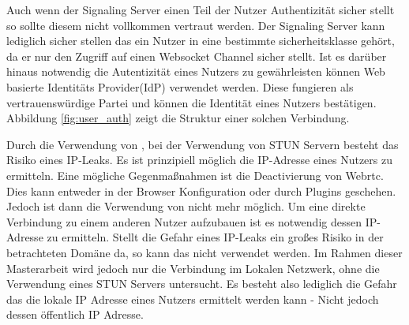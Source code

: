 Auch wenn der Signaling Server einen Teil der Nutzer Authentizität sicher stellt so sollte diesem nicht vollkommen vertraut werden. Der Signaling Server kann lediglich sicher stellen das ein Nutzer in eine bestimmte sicherheitsklasse gehört, da er nur den Zugriff auf einen Websocket Channel sicher stellt. Ist es darüber hinaus notwendig die Autentizität eines Nutzers zu gewährleisten können Web basierte Identitäts Provider(IdP) verwendet werden. Diese fungieren als vertrauenswürdige Partei und können die Identität eines Nutzers bestätigen. Abbildung \ref{fig:user_auth} zeigt die Struktur einer solchen Verbindung.

Durch die Verwendung von \webrtc, bei der Verwendung von STUN Servern besteht das Risiko eines IP-Leaks.\cite{rtcweb-security} Es ist prinzipiell möglich die IP-Adresse eines Nutzers zu ermitteln. Eine mögliche Gegenmaßnahmen ist die Deactivierung von Webrtc. Dies kann entweder in der Browser Konfiguration oder durch Plugins geschehen. Jedoch ist dann die Verwendung von \webrtc nicht mehr möglich. Um eine direkte Verbindung zu einem anderen Nutzer aufzubauen ist es notwendig dessen IP-Adresse zu ermitteln. Stellt die Gefahr eines IP-Leaks ein großes Risiko in der betrachteten Domäne da, so kann das \pTp \cdn nicht verwendet werden. Im Rahmen dieser Masterarbeit wird jedoch nur die Verbindung im Lokalen Netzwerk, ohne die Verwendung eines STUN Servers untersucht. Es besteht also lediglich die Gefahr das die lokale IP Adresse eines Nutzers ermittelt werden kann - Nicht jedoch dessen öffentlich IP Adresse.


